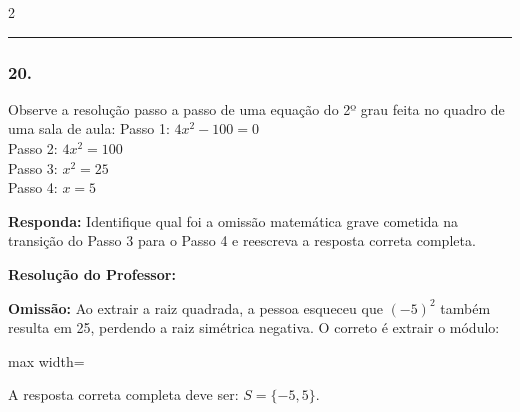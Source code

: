 \begin{multicols*}{2}
\par\vspace{\espacoQuestao}

\noindent\textcolor{CorLinha}{\rule{\linewidth}{0.5pt}} 
\par\vspace{\espacoPreQuestao}
\subsubsection*{20.} Observe a resolução passo a passo de uma equação do 2º grau feita no quadro de uma sala de aula:
Passo 1: $ 4x^2 - 100 = 0 $ \\
Passo 2: $ 4x^2 = 100 $ \\
Passo 3: $ x^2 = 25 $ \\
Passo 4: $ x = 5 $
\begin{boxresponda}
\textbf{Responda:} Identifique qual foi a omissão matemática grave cometida na transição do Passo 3 para o Passo 4 e reescreva a resposta correta completa.
\end{boxresponda}

\ifgabarito
    \begin{tcolorbox}[colback=CorTitUm!5, colframe=CorTitUm, boxrule=1pt, arc=4pt, left=6pt, right=6pt, top=6pt, bottom=6pt]
    \small\textbf{\textcolor{CorTitUm}{Resolução do Professor:}}\par\vspace{0.1cm}
    \color{CinzaEscuro}
    \textbf{Omissão:} Ao extrair a raiz quadrada, a pessoa esqueceu que $(-5)^2$ também resulta em 25, perdendo a raiz simétrica negativa. O correto é extrair o módulo:\\
    \begin{center}
    \begin{adjustbox}{max width=\linewidth}
    \end{adjustbox}
    \end{center}
    A resposta correta completa deve ser: $S = \{-5, 5\}$.
    \end{tcolorbox}
\fi


\end{multicols*}
